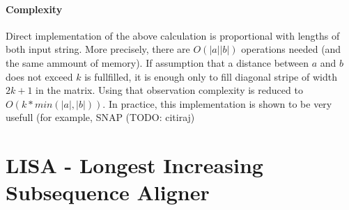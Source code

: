 \documentclass[times, utf8, diplomski]{fer}
\begin{document}
\subsubsection{Complexity}
Direct implementation of the above calculation is proportional with lengths of both input string. More precisely, there are $O(|a||b|)$ operations needed (and the same ammount of memory). If assumption that a distance between $a$ and $b$ does not exceed $k$ is fullfilled, it is enough only to fill diagonal stripe of width $2k+1$ in the matrix. Using that observation complexity is reduced to $O(k*min(|a|,|b|))$. In practice, this implementation is shown to be very usefull (for example, SNAP (TODO: citiraj)


\chapter{LISA - Longest Increasing Subsequence Aligner}
\end{document}
